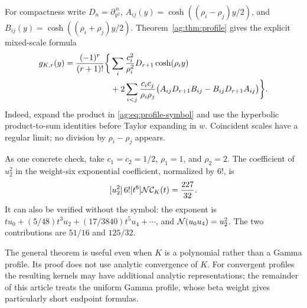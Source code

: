 For compactness write
$D_n=\partial_{y^2}^{\,n}$,
$A_{ij}(y)=\cosh((\rho_i-\rho_j)y/2)$, and
$B_{ij}(y)=\cosh((\rho_i+\rho_j)y/2)$.
Theorem~\ref{ag:thm:profile} gives the explicit mixed-scale formula
\begin{align}
 g_{K,r}(y)
 =\frac{(-1)^r}{(r+1)!}\bigg\{&
 \sum_i\frac{c_i^2}{\rho_i^2}D_{r+1}\cosh(\rho_i y)\notag\\
 &+2\sum_{i<j}\frac{c_ic_j}{\rho_i\rho_j}
 \bigl(A_{ij}D_{r+1}B_{ij}-B_{ij}D_{r+1}A_{ij}\bigr)\bigg\}.
 \label{ag:eq:mixed-square}
\end{align}
Indeed, expand the product in \eqref{ag:eq:profile-symbol} and use the
hyperbolic product-to-sum identities before Taylor expanding in $w$.
Coincident scales have a regular limit; no division by
$\rho_i-\rho_j$ appears.

As one concrete check, take $c_1=c_2=1/2$, $\rho_1=1$, and $\rho_2=2$.
The coefficient of $u_2^2$ in the weight-six exponential coefficient,
normalized by $6!$, is
\begin{equation}\label{ag:eq:mixed-example}
 [u_2^2]\,6![t^6]\mathcal N\mathcal C_K(t)=\frac{227}{32}.
\end{equation}
It can also be verified without the symbol: the exponent is
$tu_0+(5/48)t^3u_2+(17/3840)t^5u_4+\cdots$, and
$\mathcal N(u_0u_4)=u_2^2$. The two contributions are $51/16$ and $125/32$.

The general theorem is useful even when $K$ is a polynomial rather
than a Gamma profile. Its proof does not use analytic convergence of
$K$. For convergent profiles the resulting kernels may have additional
analytic representations; the remainder of this article treats the
uniform Gamma profile, whose beta weight gives particularly short
endpoint formulas.
